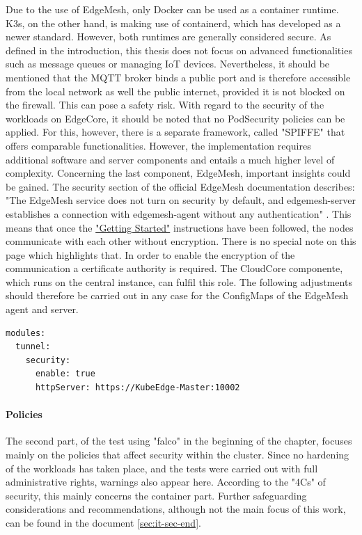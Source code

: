 \documentclass[MIC,Master,english]{twbook}%
\begin{document}
Due to the use of EdgeMesh, only Docker can be used as a container runtime. K3s, on the other hand, is making use of containerd, which has developed as a newer standard. However, both runtimes are generally considered secure. As defined in the introduction, this thesis does not focus on advanced functionalities such as message queues or managing IoT devices. Nevertheless, it should be mentioned that the MQTT broker binds a public port\cite{bk-gh-ke-node-test} and is therefore accessible from the local network as well the public internet, provided it is not blocked on the firewall. This can pose a safety risk. With regard to the security of the workloads on EdgeCore, it should be noted that no PodSecurity policies can be applied. For this, however, there is a separate framework, called "SPIFFE" that offers comparable functionalities\cite{ke-secure-fw}. However, the implementation requires additional software and server components and entails a much higher level of complexity. Concerning the last component, EdgeMesh, important insights could be gained. The security section of the official EdgeMesh documentation describes: "The EdgeMesh service does not turn on security by default, and edgemesh-server establishes a connection with edgemesh-agent without any authentication" \cite{em-security}. This means that once the \hyperref{https://edgemesh.netlify.app/guide/getting-started.html}{}{}{"Getting Started"} \cite{em-getstart} instructions have been followed, the nodes communicate with each other without encryption. There is no special note on this page which highlights that. In order to enable the encryption of the communication a certificate authority is required. The CloudCore componente, which runs on the central instance, can fulfil this role. The following adjustments should therefore be carried out in any case for the ConfigMaps of the EdgeMesh agent and server.

\begin{lstlisting}[caption={EdgeMesh security\cite{bk-gh-ke-node-test}},captionpos=b]
modules:
  tunnel:
    security:
      enable: true
      httpServer: https://KubeEdge-Master:10002
\end{lstlisting}

\paragraph{Policies} The second part, of the test using "falco" \cite{falco-scan} in the beginning of the chapter, focuses mainly on the policies that affect security within the cluster. Since no hardening of the workloads has taken place, and the tests were carried out with full administrative rights, warnings also appear here. According to the "4Cs" of security, this mainly concerns the container part. Further safeguarding considerations and recommendations, although not the main focus of this work, can be found in the document \autoref{sec:it-sec-end}.
\end{document}
